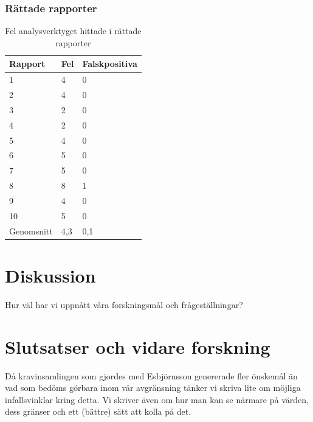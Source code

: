 \documentclass[swedish]{maucsthesis}
\begin{document}
\subsubsection{Rättade rapporter}

\begin{table}[H]
\centering
\begin{tabular}{|l|l|l|}
\hline
Rapport    & Fel & Falskpositiva \\ \hline
1          & 4   & 0             \\ \hline
2          & 4   & 0             \\ \hline
3          & 2   & 0             \\ \hline
4          & 2   & 0             \\ \hline
5          & 4   & 0             \\ \hline
6          & 5   & 0             \\ \hline
7          & 5   & 0             \\ \hline
8          & 8   & 1             \\ \hline
9          & 4   & 0             \\ \hline
10         & 5   & 0             \\ \hline
Genomsnitt & 4,3 & 0,1           \\ \hline
\end{tabular}
\caption{Fel analysverktyget hittade i rättade rapporter}
\label{gradedtable}
\end{table}

\section{Diskussion}
Hur väl har vi uppnått våra forskningsmål och frågeställningar?
\section{Slutsatser och vidare forskning}\label{slutsatserochvidareforskning}
Då kravinsamlingen som gjordes med Esbjörnsson genererade fler önskemål än
vad som bedöms görbara inom vår avgränsning tänker vi skriva lite om möjliga
infallsvinklar kring detta.
Vi skriver även om hur man kan se närmare på värden, dess gränser och ett (bättre) sätt att kolla på det.

%
\newpage
{}



\end{document}
